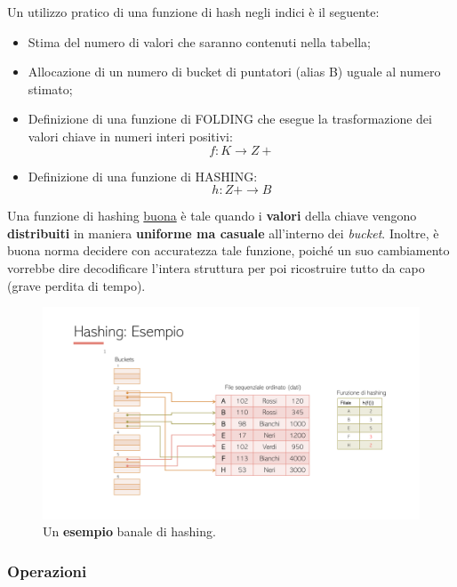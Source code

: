 \documentclass[a4paper]{article}
\begin{document}
	\noindent
	Un utilizzo pratico di una funzione di hash negli indici è il seguente:
	\begin{itemize}
		\item Stima del numero di valori che saranno contenuti nella tabella;
		\item Allocazione di un numero di bucket di puntatori (alias B) uguale al numero stimato;
		\item Definizione di una funzione di FOLDING che esegue la trasformazione dei valori chiave in numeri interi positivi:
		\begin{equation*}
			f: K \rightarrow Z+
		\end{equation*}
		\item Definizione di una funzione di HASHING:
		\begin{equation*}
			h: Z+ \rightarrow B
		\end{equation*}
	\end{itemize}
	Una funzione di hashing \underline{buona} è tale quando i \textbf{valori} della chiave vengono \textbf{distribuiti} in maniera \textbf{uniforme ma casuale} all'interno dei \emph{bucket}. Inoltre, è buona norma decidere con accuratezza tale funzione, poiché un suo cambiamento vorrebbe dire decodificare l'intera struttura per poi ricostruire tutto da capo (grave perdita di tempo).
	\begin{figure}[!htp]
		\centering
		\includegraphics[width=\textwidth]{img/hashing_banale.pdf}
		\caption{Un \textcolor{Green4}{\textbf{esempio}} banale di hashing.}
	\end{figure}\newpage

	\subsubsection{Operazioni}
	
\end{document}
